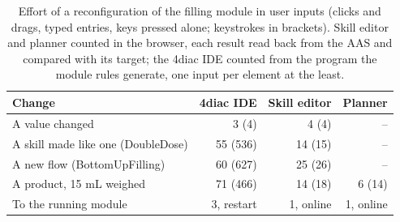 \begin{table}[t]
\centering
\caption{Effort of a reconfiguration of the filling module in user inputs (clicks and drags, typed entries, keys pressed alone; keystrokes in brackets). Skill editor and planner counted in the browser, each result read back from the AAS and compared with its target; the 4diac IDE counted from the program the module rules generate, one input per element at the least.}
\label{tab:effort}
\small
\begin{tabular}{@{}lrrr@{}}
\hline
Change & 4diac IDE & Skill editor & Planner \\
\hline
A value changed & 3 (4) & 4 (4) & -- \\
A skill made like one (DoubleDose) & 55 (536) & 14 (15) & -- \\
A new flow (BottomUpFilling) & 60 (627) & 25 (26) & -- \\
A product, 15 mL weighed & 71 (466) & 14 (18) & 6 (14) \\
\hline
To the running module & 3, restart & 1, online & 1, online \\
\hline
\end{tabular}
\end{table}
